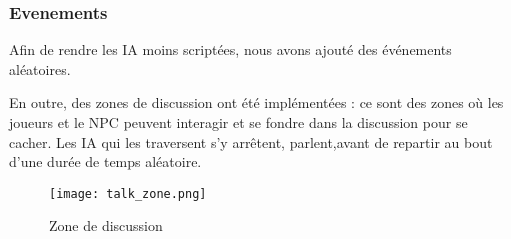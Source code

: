    
    \subsubsection{Evenements}

    Afin de rendre les IA moins scriptées, nous avons ajouté des événements aléatoires.
    
    En outre, des zones de discussion ont été implémentées : ce sont des zones où les joueurs et le NPC peuvent interagir 
    et se fondre dans la discussion pour se cacher. Les IA qui les traversent s'y arrêtent, parlent,avant de repartir au bout d'une durée 
    de temps aléatoire.

    \begin{figure}[hbt!]
        \centering
        \texttt{[image: talk\_zone.png]}
        \caption{Zone de discussion}
    \end{figure}